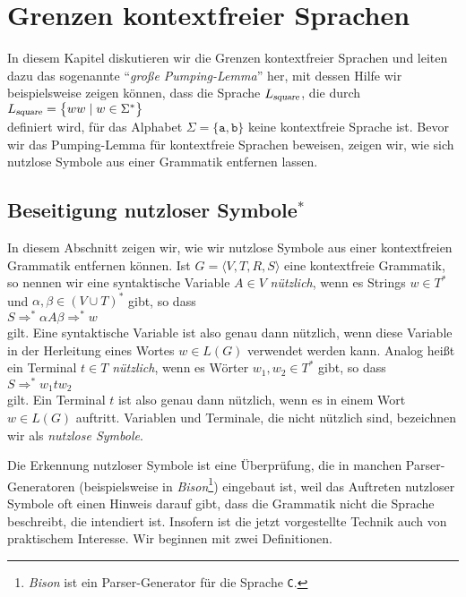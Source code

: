 \chapter{Grenzen kontextfreier Sprachen} 
In diesem Kapitel diskutieren wir die Grenzen kontextfreier Sprachen und leiten dazu das
sogenannte ``\emph{gro{\ss}e Pumping-Lemma}'' her, mit dessen Hilfe wir beispielsweise zeigen
k\"onnen, dass die Sprache $L_{\mbox{\scriptsize \textsl{square}}}$, die durch
\\[0.2cm]
\hspace*{1.3cm} $L_{\mbox{\scriptsize \textsl{square}}} = \bigl\{ ww \mid w \in \Sigma^*\bigr\}$
\\[0.2cm]
definiert wird, f\"ur das Alphabet $\Sigma =\{\texttt{a}, \texttt{b}\}$ keine kontextfreie Sprache
ist.  Bevor wir das Pumping-Lemma f\"ur kontextfreie Sprachen beweisen, zeigen wir, wie sich nutzlose
Symbole aus einer Grammatik entfernen lassen. 

\section{Beseitigung nutzloser Symbole$^*$}
In diesem Abschnitt zeigen wir, wie wir nutzlose Symbole aus einer kontextfreien Grammatik entfernen
k\"onnen. Ist $G = \langle V, T, R, S \rangle$ eine kontextfreie Grammatik, so nennen wir
eine syntaktische Variable $A \in V$ \emph{n\"utzlich}, wenn es Strings $w \in T^*$ und
$\alpha,\beta \in (V \cup T)^*$ gibt, so dass  
\\[0.2cm]
\hspace*{1.3cm}
$S \Rightarrow^* \alpha A \beta \Rightarrow^* w$
\\[0.2cm]
gilt.  Eine syntaktische Variable ist also genau dann n\"utzlich, wenn diese Variable in der Herleitung
eines Wortes $w \in L(G)$ verwendet werden kann.  Analog hei{\ss}t
ein Terminal $t \in T$ \emph{n\"utzlich}, wenn es W\"orter $w_1, w_2 \in T^*$ gibt, so dass
\\[0.2cm]
\hspace*{1.3cm}
$S \Rightarrow^* w_1 t w_2$
\\[0.2cm]
gilt.  Ein Terminal $t$ ist also genau dann n\"utzlich, wenn es in einem Wort  $w \in L(G)$
auftritt.  Variablen und Terminale, die nicht n\"utzlich sind, bezeichnen wir als
\emph{nutzlose Symbole}.

Die Erkennung nutzloser Symbole ist eine \"Uberpr\"ufung, die in manchen Parser-Generatoren
(beispielsweise in \textsl{Bison}\footnote{
\textsl{Bison} ist ein Parser-Generator f\"ur die Sprache \texttt{C}.}) 
eingebaut ist, weil das Auftreten nutzloser Symbole oft
einen Hinweis darauf gibt, dass die Grammatik nicht die Sprache beschreibt, die intendiert ist.  
Insofern ist die jetzt vorgestellte Technik auch von praktischem Interesse.
Wir beginnen mit zwei Definitionen.

